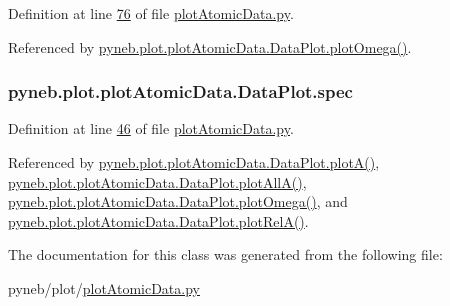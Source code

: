 Definition at line \hyperlink{plot_atomic_data_8py_source_l00076}{76} of file \hyperlink{plot_atomic_data_8py_source}{plot\+Atomic\+Data.\+py}.



Referenced by \hyperlink{plot_atomic_data_8py_source_l00372}{pyneb.\+plot.\+plot\+Atomic\+Data.\+Data\+Plot.\+plot\+Omega()}.

\hypertarget{classpyneb_1_1plot_1_1plot_atomic_data_1_1_data_plot_acaaca83a6e12e99ebc1da72af5f8c60a}{}
\subsubsection[{spec}]{\setlength{\rightskip}{0pt plus 5cm}pyneb.\+plot.\+plot\+Atomic\+Data.\+Data\+Plot.\+spec}\label{classpyneb_1_1plot_1_1plot_atomic_data_1_1_data_plot_acaaca83a6e12e99ebc1da72af5f8c60a}


Definition at line \hyperlink{plot_atomic_data_8py_source_l00046}{46} of file \hyperlink{plot_atomic_data_8py_source}{plot\+Atomic\+Data.\+py}.



Referenced by \hyperlink{plot_atomic_data_8py_source_l00116}{pyneb.\+plot.\+plot\+Atomic\+Data.\+Data\+Plot.\+plot\+A()}, \hyperlink{plot_atomic_data_8py_source_l00188}{pyneb.\+plot.\+plot\+Atomic\+Data.\+Data\+Plot.\+plot\+All\+A()}, \hyperlink{plot_atomic_data_8py_source_l00372}{pyneb.\+plot.\+plot\+Atomic\+Data.\+Data\+Plot.\+plot\+Omega()}, and \hyperlink{plot_atomic_data_8py_source_l00261}{pyneb.\+plot.\+plot\+Atomic\+Data.\+Data\+Plot.\+plot\+Rel\+A()}.



The documentation for this class was generated from the following file\+:\begin{DoxyCompactItemize}
\item 
pyneb/plot/\hyperlink{plot_atomic_data_8py}{plot\+Atomic\+Data.\+py}\end{DoxyCompactItemize}
